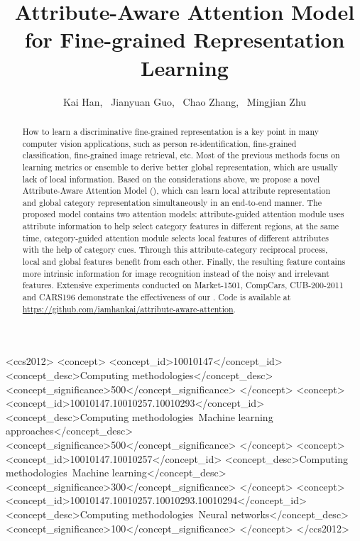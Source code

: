\documentclass[sigconf]{acmart}
\begin{document}
\title{Attribute-Aware Attention Model for Fine-grained Representation Learning}

\author{Kai Han, ~Jianyuan Guo, ~Chao Zhang, ~Mingjian Zhu}

\begin{abstract}
How to learn a discriminative fine-grained representation is a key point in many computer vision applications, such as person re-identification, fine-grained classification, fine-grained image retrieval, etc. Most of the previous methods focus on learning metrics or ensemble to derive better global representation, which are usually lack of local information. Based on the considerations above, we propose a novel Attribute-Aware Attention Model (), which can learn local attribute representation and global category representation simultaneously in an end-to-end manner. The proposed model contains two attention models: attribute-guided attention module uses attribute information to help select category features in different regions, at the same time, category-guided attention module selects local features of different attributes with the help of category cues. Through this attribute-category reciprocal process, local and global features benefit from each other. Finally, the resulting feature contains more intrinsic information for image recognition instead of the noisy and irrelevant features. Extensive experiments conducted on Market-1501, CompCars, CUB-200-2011 and CARS196 demonstrate the effectiveness of our . Code is available at \url{https://github.com/iamhankai/attribute-aware-attention}.
\end{abstract}

\begin{CCSXML}
<ccs2012>
<concept>
<concept_id>10010147</concept_id>
<concept_desc>Computing methodologies</concept_desc>
<concept_significance>500</concept_significance>
</concept>
<concept>
<concept_id>10010147.10010257.10010293</concept_id>
<concept_desc>Computing methodologies~Machine learning approaches</concept_desc>
<concept_significance>500</concept_significance>
</concept>
<concept>
<concept_id>10010147.10010257</concept_id>
<concept_desc>Computing methodologies~Machine learning</concept_desc>
<concept_significance>300</concept_significance>
</concept>
<concept>
<concept_id>10010147.10010257.10010293.10010294</concept_id>
<concept_desc>Computing methodologies~Neural networks</concept_desc>
<concept_significance>100</concept_significance>
</concept>
</ccs2012>
\end{CCSXML}
\end{document}
